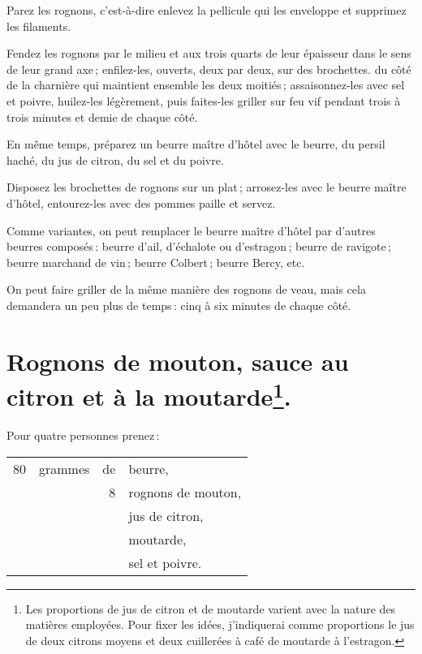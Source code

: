 Parez les rognons, c’est-à-dire enlevez la pellicule qui les enveloppe et
supprimez les filaments.

Fendez les rognons par le milieu et aux trois quarts de leur épaisseur dans le
sens de leur grand axe ; enfilez-les, ouverts, deux par deux, sur des
brochettes. du côté de la charnière qui maintient ensemble les deux moitiés ;
assaisonnez-les avec sel et poivre, huilez-les légèrement, puis faites-les
griller sur feu vif pendant trois à trois minutes et demie de chaque côté.

En même temps, préparez un beurre maître d'hôtel avec le beurre, du persil
haché, du jus de citron, du sel et du poivre.

Disposez les brochettes de rognons sur un plat ; arrosez-les avec le beurre
maître d'hôtel, entourez-les avec des pommes paille et servez.

\sk

Comme variantes, on peut remplacer le beurre maître d'hôtel par d'autres
beurres composés : beurre d'ail, d'échalote ou d'estragon ; beurre de
ravigote ; beurre marchand de vin ; beurre Colbert ; beurre Bercy, etc.

\sk

On peut faire griller de la même manière des rognons de veau, mais cela
demandera un peu plus de temps : cinq à six minutes de chaque côté.

\section*{\centering Rognons de mouton, sauce au citron et à la
moutarde\footnote{ Les proportions de jus de citron et de moutarde varient avec
la nature des matières employées. Pour fixer les idées, j'indiquerai comme
proportions le jus de deux citrons moyens et deux cuillerées à café de moutarde
à l'estragon.}.}
{}

Pour quatre personnes prenez :

\medskip

\footnotesize
\begin{longtable}{rrrp{18em}}
     80 & grammes & de & beurre,                                                                          \\
        &         &  8 & rognons de mouton,                                                               \\
        &         &    & jus de citron,                                                                   \\
        &         &    & moutarde,                                                                        \\
        &         &    & sel et poivre.                                                                   \\
\end{longtable}
\normalsize

